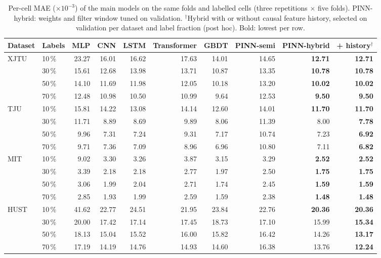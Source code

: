 \begin{table}[t]\centering\small\setlength{\tabcolsep}{4.5pt}
\caption{Per-cell MAE ($\times10^{-3}$) of the main models on the same folds and labelled cells (three repetitions $\times$ five folds). PINN-hybrid: weights and filter window tuned on validation. $^\dagger$Hybrid with or without causal feature history, selected on validation per dataset and label fraction (post hoc). Bold: lowest per row.}\label{tab:main}
\begin{adjustbox}{max width=\textwidth}\begin{tabular}{llrrrrrrrr}\toprule
Dataset & Labels & MLP & CNN & LSTM & Transformer & GBDT & PINN-semi & PINN-hybrid & + history$^\dagger$ \\\midrule
XJTU & 10\,\% & 23.27 & 16.01 & 16.62 & 17.63 & 14.01 & 14.65 & \textbf{12.71} & \textbf{12.71} \\
 & 30\,\% & 15.61 & 12.68 & 13.98 & 13.71 & 10.87 & 13.35 & \textbf{10.78} & \textbf{10.78} \\
 & 50\,\% & 14.10 & 11.69 & 11.98 & 12.05 & 10.18 & 13.20 & \textbf{10.02} & \textbf{10.02} \\
 & 70\,\% & 12.48 & 10.98 & 10.50 & 10.99 & 9.64 & 12.53 & \textbf{9.50} & \textbf{9.50} \\
\addlinespace
TJU & 10\,\% & 15.81 & 14.22 & 13.08 & 14.14 & 12.60 & 14.01 & \textbf{11.70} & \textbf{11.70} \\
 & 30\,\% & 11.71 & 8.89 & 8.69 & 9.89 & 8.06 & 11.39 & 8.00 & \textbf{7.78} \\
 & 50\,\% & 9.96 & 7.31 & 7.24 & 9.31 & 7.17 & 10.74 & 7.23 & \textbf{6.92} \\
 & 70\,\% & 9.71 & 7.36 & 7.09 & 8.96 & 6.96 & 10.80 & 7.11 & \textbf{6.82} \\
\addlinespace
MIT & 10\,\% & 9.02 & 3.30 & 3.26 & 3.87 & 3.15 & 3.29 & \textbf{2.52} & \textbf{2.52} \\
 & 30\,\% & 3.39 & 2.18 & 2.18 & 2.77 & 1.97 & 2.50 & \textbf{1.75} & \textbf{1.75} \\
 & 50\,\% & 3.06 & 1.99 & 2.04 & 2.71 & 1.74 & 2.45 & \textbf{1.59} & \textbf{1.59} \\
 & 70\,\% & 2.85 & 1.93 & 1.99 & 2.59 & 1.59 & 2.38 & \textbf{1.48} & \textbf{1.48} \\
\addlinespace
HUST & 10\,\% & 41.62 & 22.77 & 24.51 & 21.95 & 23.84 & 22.76 & \textbf{20.36} & \textbf{20.36} \\
 & 30\,\% & 20.00 & 17.42 & 17.14 & 17.45 & 18.73 & 17.10 & 15.99 & \textbf{15.34} \\
 & 50\,\% & 18.13 & 15.04 & 15.52 & 16.00 & 15.82 & 16.42 & 14.26 & \textbf{13.17} \\
 & 70\,\% & 17.19 & 14.19 & 14.76 & 14.93 & 14.60 & 16.38 & 13.76 & \textbf{12.24} \\
\bottomrule\end{tabular}\end{adjustbox}\end{table}
